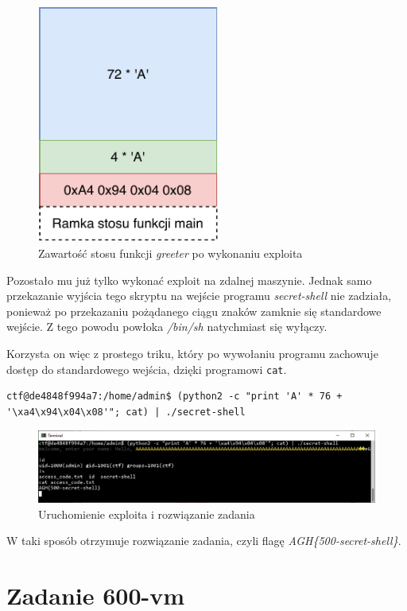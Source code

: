 \documentclass[language=polish,type=eng]{aghmodern}
\begin{document}
\begin{figure}[H]
\centering
\includegraphics[width=6cm]{500_overflow}
\caption{Zawartość stosu funkcji \emph{greeter} po wykonaniu exploita}
\end{figure}

Pozostało mu już tylko wykonać exploit na zdalnej maszynie. Jednak samo przekazanie
wyjścia tego skryptu na wejście programu \emph{secret-shell} nie zadziała, ponieważ
po przekazaniu pożądanego ciągu znaków zamknie się standardowe wejście.
Z tego powodu powłoka \emph{/bin/sh} natychmiast się wyłączy.

Korzysta on więc z prostego triku, który po wywołaniu programu zachowuje dostęp
do standardowego wejścia, dzięki programowi \texttt{cat}.

\begin{verbatim}
ctf@de4848f994a7:/home/admin$ (python2 -c "print 'A' * 76 + '\xa4\x94\x04\x08'"; cat) | ./secret-shell
\end{verbatim}

\begin{figure}[H]
\centering
\includegraphics[width=\textwidth]{500_solution}
\caption{Uruchomienie exploita i rozwiązanie zadania}
\end{figure}

W taki sposób otrzymuje rozwiązanie zadania, czyli flagę \emph{AGH\{500-secret-shell\}}.

\section{Zadanie 600-vm}

\backmatter

\cleardoublepage
\listoffigures


\cleardoublepage
\printbibliography
\end{document}
